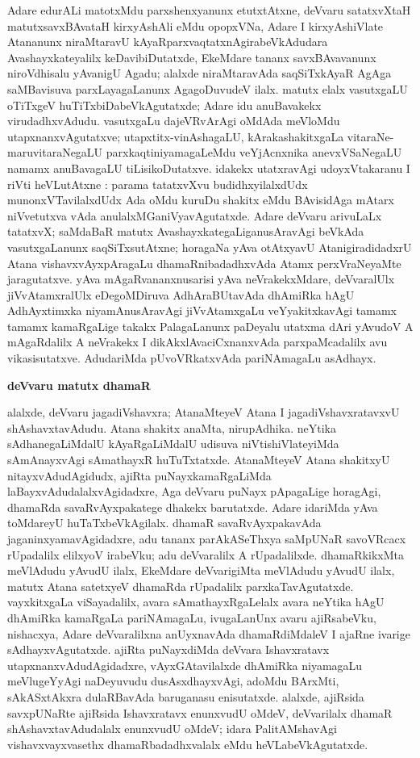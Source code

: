 Adare edurALi matotxMdu parxshenxyanunx etutxtAtxne, deVvaru satatxvXtaH matutx\break savxBA\-vataH kirxyAshAli eMdu opopxVNa, Adare I kirxyAshiVlate Atananunx niraMta\-ravU kAyaR\-parxvaqtatxnAgirabeVkAdudara Avashayxkateyalilx keDavibiDutatxde, EkeMdare tananx savxBAvavanunx niroVdhisalu yAvanigU Agadu; alalxde niraMtaravAda saqSiTxkAyaR AgAga saMBavisuva parxLayagaLanunx AgagoDuvudeV ilalx. matutx elalx vasutxgaLU oTiTxgeV huTiTx\-biDabeVkAgutatxde; Adare idu anuBavakekx virudadhxvAdudu. vasutxgaLu dajeVRvArAgi oMdAda meVloMdu utapxnanxvAgutatxve; utapxtitx-vinAshagaLU, kArakashakitxgaLa vitaraNe-\-maruvitaraNegaLU parxkaqtiniyamagaLeMdu veYjAcnxnika anevxVSaNegaLU namamx anuBava\-gaLU tiLisikoDutatxve. idakekx utatxravAgi udoyxVtakaranu I riVti heVLutAtxne : parama tatatxvXvu budidhxyilalxdUdx munonxVTavilalxdUdx Ada oMdu kuruDu shakitx eMdu BAvisi\-dAga mAtarx niVvetutxva vAda anulalxMGaniVyavAgutatxde. Adare deVvaru arivuLaLx tatatxvX; saMdaBaR matutx AvashayxkategaLiganusAravAgi beVkAda vasutxgaLanunx saqSiTxsutAtxne; hora\-gaNa yAva otAtxyavU AtanigiradidadxrU Atana vishavxvAyxpAragaLu dhamaRnibadadhx\-vAda Atamx perxVraNeyaMte jaragutatxve. yAva mAgaRvananxnusarisi yAva neVra\-kekxMdare, deVva\-ralUlx jiVvAtamxralUlx eDegoMDiruva AdhAraBUtavAda dhAmiRka hAgU AdhAyxtimxka niyamAnusAravAgi jiVvAtamxgaLu veYyakitxkavAgi tamamx tamamx kamaRgaLige takakx Pala\-gaLanunx paDeyalu utatxma dAri yAvudoV A mAgaRdalilx A neVrakekx I dikAkxlAva\-ciCxnanxvAda parxpaMcadalilx avu vikasisutatxve. AdudariMda pUvoVRkatxvAda pariNAma\-gaLu asAdhayx.

\bigskip
\begin{center}
{\Large\bf deVvaru matutx dhamaR}
\end{center}

alalxde, deVvaru jagadiVshavxra; AtanaMteyeV Atana I jagadiVshavxratavxvU shAshavxta\-vAdudu. Atana shakitx anaMta, nirupAdhika. neYtika sAdhanegaLiMdalU kAyaRgaLiMdalU udisuva niVtishiVlateyiMda sAmAnayxvAgi sAmathayxR huTuTxtatxde. AtanaMteyeV Atana shakitxyU nitayxvAdudAgidudx, ajiRta puNayxkamaRgaLiMda laBayxvAdudalalxvAgidadxre, Aga deVvaru puNayx pApagaLige horagAgi, dhamaRda savaRvAyxpakatege dhakekx barutatxde. Adare idariMda yAva toMdareyU huTaTxbeVkAgilalx. dhamaR savaRvAyxpakavAda jaganinxyamavAgidadxre, adu tananx parAkASeThxya saMpUNaR savoVRcacx rUpadalilx elilxyoV irabeVku; adu deVvaralilx A rUpadalilxde. dhamaRkikxMta meVlAdudu yAvudU ilalx, EkeMdare deVvarigiMta meVlAdudu yAvudU ilalx, matutx Atana satetxyeV dhamaRda rUpadalilx parxkaTavAgutatxde. vayxkitxgaLa viSayadalilx, avara sAmathayxRgaLelalx avara neYtika hAgU dhAmiRka kamaRgaLa pariNAmagaLu, ivugaLanUnx avaru ajiRsabeVku, nishacxya, Adare deVvaralilxna anUyxnavAda dhamaRdiMdaleV I ajaRne ivarige sAdhayxvAgutatxde. ajiRta puNayxdiMda deVvara Ishavxratavx utapxnanxvAdudAgidadxre, vAyxGAtavilalxde dhAmiRka niyamagaLu meVlugeYyAgi naDeyuvudu dusAsxdhayxvAgi, adoMdu BArxMti, sAkASxtAkxra dulaRBavAda baruganasu enisutatxde. alalxde, ajiRsida savxpUNaRte ajiRsida Ishavxratavx enunxvudU oMdeV, deVvarilalx dhamaR shAshavxtavAdudalalx enunxvudU oMdeV; idara PalitAMshavAgi vishavxvayxvasethx dhamaRbadadhxvalalx eMdu heVLabeVkAgutatxde.

